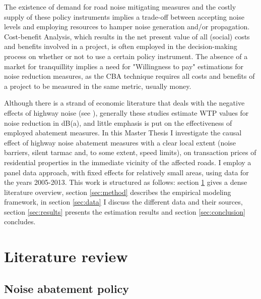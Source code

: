 \documentclass[12pt]{scrartcl}
\begin{document}
	The existence of demand for road noise mitigating measures and the costly supply of these policy instruments implies a trade-off between accepting noise levels and employing resources to hamper noise generation and/or propagation. Cost-benefit Analysis, which results in the net present value of all (social) costs and benefits involved in a project, is often employed in the decision-making process on whether or not to use a certain policy instrument. The absence of a market for tranquillity implies a need for "Willingness to pay" estimations for noise reduction measures, as the CBA technique requires all costs and benefits of a project to be measured in the same metric, usually money.
	
	Although there is a strand of economic literature that deals with the negative effects of highway noise (see \cite{Nelson1982,Nelson2008,Bateman2001}), generally these studies estimate WTP values for noise reduction in dB(a), and little emphasis is put on the effectiveness of employed abatement measures. In this Master Thesis I investigate the causal effect of highway noise abatement measures with a clear local extent (noise barriers, silent tarmac and, to some extent, speed limits), on transaction prices of residential properties in the immediate vicinity of the affected roads. I employ a panel data approach, with fixed effects for relatively small areas, using data for the years 2005-2013. This work is structured as follows: section \ref{sec:litrev} gives a dense literature overview, section \ref{sec:method} describes the empirical modeling framework, in section \ref{sec:data} I discuss the different data and their sources, section \ref{sec:results} presents the estimation results and section \ref{sec:conclusion} concludes.
	
	\section{Literature review}
	\label{sec:litrev}
		
		\subsection{Noise abatement policy}	
	
\end{document}
